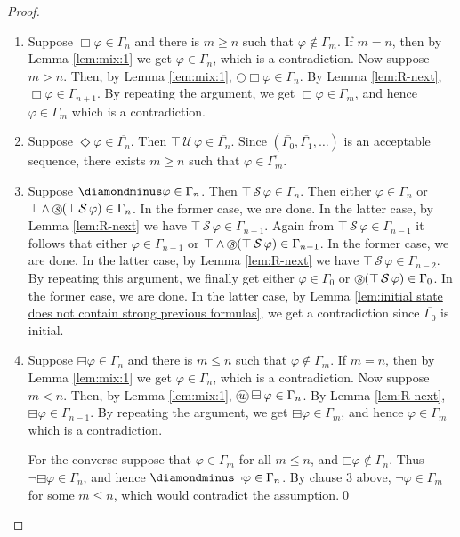 \documentclass[envcountsect,envcountsame,oribibl,orivec]{llncs}
\newcommand*\circled[1]{\tikz[baseline=(char.base)]{
		\node[shape=circle,draw,inner sep=0.4pt] (char) {#1};}}
\newcommand{\lnext}{\bigcirc}
\newcommand{\lalways}{\Box}
\newcommand{\leventually}{\Diamond}
\newcommand{\lonce}{\diamondminus}
\newcommand{\lsofar}{\boxminus}
\newcommand{\luntil}{{\,\mathcal{U}\,}}
\newcommand{\lsince}{{\,\mathcal{S}\,}}
\newcommand{\wprevious}{\circled{\textit{w}}}
\newcommand{\sprevious}{\circled{\textit{s}}}
\renewcommand{\phi}{\varphi}
\begin{document}
\begin{proof}
\begin{enumerate}
	\item Suppose $\lalways \phi \in \Gamma_n$ and there is $m \geq n$ such that $\phi \not \in \Gamma_{m}$. If $m=n$, then by Lemma \ref{lem:mix:1} we get $\phi \in \Gamma_n$, which is a contradiction. Now suppose $m > n$. Then, by Lemma \ref{lem:mix:1}, $\lnext \lalways \phi \in \Gamma_n$. By Lemma \ref{lem:R-next}, $\lalways \phi \in \Gamma_{n+1}$.  By repeating the argument, we get $\lalways \phi \in \Gamma_m$, and hence $\phi \in \Gamma_m$  which is a contradiction.
	
	\item Suppose $\leventually \phi \in \overline{\Gamma_n}$. Then $ \top \luntil  \phi \in \overline{\Gamma_n}$. Since $(\overline{\Gamma_0}, \overline{\Gamma_1}, \ldots)$ is an acceptable sequence, there exists $m \geq n$ such that $\phi \in \overline{\Gamma_m}$.
	
	\item Suppose $\lonce \phi \in \Gamma_n$. Then $\top \lsince \phi \in \Gamma_{n}$. Then either $\phi \in \Gamma_n$ or $\top \wedge \sprevious (\top \lsince \phi) \in \Gamma_n$. In the former case, we are done. In the latter case, by Lemma \ref{lem:R-next} we have $\top \lsince \phi \in \Gamma_{n-1}$. Again from $\top \lsince \phi \in \Gamma_{n-1}$ it follows that either $\phi \in \Gamma_{n-1}$ or $\top \wedge \sprevious (\top \lsince \phi) \in \Gamma_{n-1}$. In the former case, we are done. In the latter case, by Lemma \ref{lem:R-next} we have $\top \lsince \phi \in \Gamma_{n-2}$. By repeating this argument, we finally get  either $\phi \in \Gamma_0$ or $\sprevious (\top \lsince \phi) \in \Gamma_0$. In the former case, we are done. In the latter case, by Lemma \ref{lem:initial state does not contain strong previous formulas}, we get a contradiction since $\overline{\Gamma_0}$ is initial. 
	
	\item Suppose $\lsofar \phi \in \Gamma_n$ and there is $m \leq n$ such that $\phi \not \in \Gamma_{m}$. If $m=n$, then by Lemma \ref{lem:mix:1} we get $\phi \in \Gamma_n$, which is a contradiction. Now suppose $m < n$. Then, by Lemma \ref{lem:mix:1}, $\wprevious \lsofar \phi \in \Gamma_n$. By Lemma \ref{lem:R-next}, $\lsofar \phi \in \Gamma_{n-1}$.  By repeating the argument, we get $\lsofar \phi \in \Gamma_m$, and hence $\phi \in \Gamma_m$  which is a contradiction.
	
	For the converse suppose that $\phi \in \Gamma_m$ for all $m \leq n$, and $\lsofar \phi \not \in \Gamma_n$. Thus $\neg \lsofar \phi \in \Gamma_{n}$, and hence $\lonce \neg \phi \in \Gamma_{n}$. By clause 3 above, $\neg \phi \in \Gamma_m$ for some $m \leq n$, which would contradict the assumption.\qed
\end{enumerate}
\end{proof}
\end{document}
